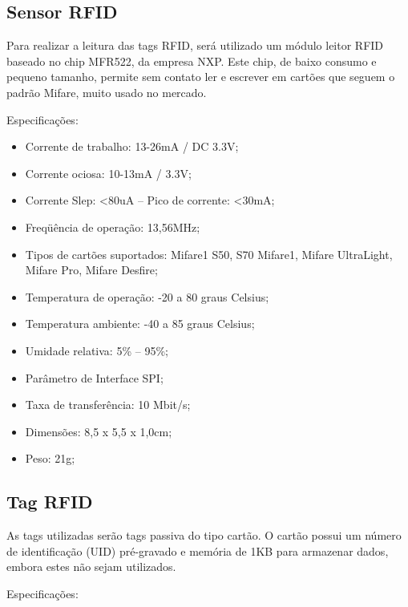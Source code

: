 \documentclass[
	12pt,				%
	openright,			%
	oneside,			%
	a4paper,			%
	english,			%
	french,				%
	spanish,			%
	brazil				%
	]{abntex2}
\begin{document}
\subsection{Sensor RFID}

Para realizar a leitura das tags RFID, será utilizado um módulo leitor RFID baseado no chip MFR522, da empresa NXP. Este chip, de baixo consumo e pequeno tamanho, permite sem contato ler e escrever em cartões que seguem o padrão Mifare, muito usado no mercado.\cite{siteleitor}

Especificações:\cite{siteleitor}

\begin{itemize}
	\item Corrente de trabalho: 13-26mA / DC 3.3V;
	\item Corrente ociosa: 10-13mA / 3.3V;
	\item Corrente Slep: <80uA – Pico de corrente: <30mA;
	\item Freqüência de operação: 13,56MHz;
	\item Tipos de cartões suportados: Mifare1 S50, S70 Mifare1, Mifare UltraLight, Mifare Pro, Mifare Desfire;
	\item Temperatura de operação: -20 a 80 graus Celsius;
	\item Temperatura ambiente: -40 a 85 graus Celsius;
	\item Umidade relativa: 5\% – 95\%;
	\item Parâmetro de Interface SPI;
	\item Taxa de transferência: 10 Mbit/s;
	\item Dimensões: 8,5 x 5,5 x 1,0cm;
	\item Peso: 21g;
\end{itemize}



\subsection{Tag RFID}

As tags utilizadas serão tags passiva do tipo cartão. O cartão possui um número de identificação (UID) pré-gravado e memória de 1KB para armazenar dados, embora estes não sejam utilizados.

Especificações:\cite{sitecartao}
\end{document}
